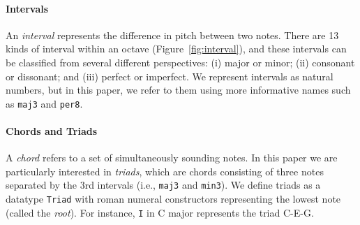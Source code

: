 \paragraph{Intervals}

\Interval

An \emph{interval} represents the difference in pitch between
two notes.
There are 13 kinds of interval within an octave
(Figure~\ref{fig:interval}), and these intervals can be classified from
several different perspectives:
(i) major or minor; (ii) consonant or dissonant; and (iii) perfect
or imperfect.
We represent intervals as natural numbers, but in this paper, we
refer to them using more informative names such as \texttt{maj3}
and \texttt{per8}.

\paragraph{Chords and Triads}

A \emph{chord} refers to a set of simultaneously sounding notes.
In this paper we are particularly interested in \emph{triads},
which are chords consisting of three notes separated by the 3rd
intervals (i.e., \texttt{maj3} and \texttt{min3}).
We define triads as a datatype \texttt{Triad} with roman numeral
constructors representing the lowest note (called the \emph{root}).
For instance, \texttt{I} in C major represents the triad C-E-G.